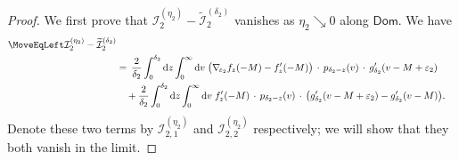 \documentclass[oneside,final,11pt]{amsart}
\theoremstyle{definition}
\renewcommand{\d}{\mathrm{d}}
\newcommand{\Dom}{\mathsf{Dom}}
\newcommand{\1}[1]{\mathbf{1}_{#1}}
\newcommand{\eps}{\varepsilon}
\newcommand{\wt}{\widetilde}
\newcommand{\CI}{\mathcal{I}}
\numberwithin{equation}{section}
\begin{document}
\begin{proof}
We first prove that $\CI^{(\eta_2)}_2 - \wt{\CI}^{(\delta_2)}_2$ vanishes as $\eta_2 \searrow 0$ along $\Dom$. We have
\begin{align}
\MoveEqLeft
	\CI^{(\eta_2)}_2 - \wt{\CI}^{(\delta_2)}_2 \\
	&=\, \frac{2}{\delta_2} \int_{0}^{\delta_2} \d z \int_{0}^{\infty} \d v\; \bigl(\nabla_{\!\eps_2} f_z(-M) - f'_z(-M)\bigr) \,\cdot\, p_{\delta_2 - z}(v) \,\cdot\, g'_{\delta_2}(v - M + \eps_2)\\
	&\quad+ \frac{2}{\delta_2} \int_{0}^{\delta_2} \d z \int_{0}^{\infty} \d v\; f'_z(-M) \,\cdot\, p_{\delta_2 - z}(v) \,\cdot\, \bigl(g'_{\delta_2}(v - M + \eps_2) - g'_{\delta_2}(v - M)\bigr).
\end{align}
Denote these two terms by $\CI^{(\eta_2)}_{2, 1}$ and $\CI^{(\eta_2)}_{2, 2}$ respectively; we will show that they both vanish in the limit.


\end{proof}
\end{document}
